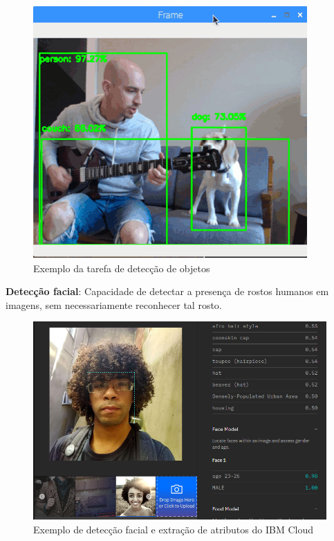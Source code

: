 \documentclass{article}
\begin{document}
\begin{figure}[H]
    \centering
    \includegraphics[scale=0.5]{imagens/deteccao_objetos.png}
    \caption{Exemplo da tarefa de detecção de objetos} %
    \label{fig:detecção_obetos}
\end{figure}
\textbf{Detecção facial}: Capacidade de detectar a presença de rostos humanos em imagens, sem necessariamente reconhecer tal rosto.\\
\begin{figure}[H]
    \centering
    \includegraphics[scale=0.29]{imagens/caracteristicas_watson_visual_recog.png}
    \caption{Exemplo de detecção facial e extração de atributos do IBM Cloud}
    \label{fig:detecção_facial}
\end{figure}{}
\end{document}
